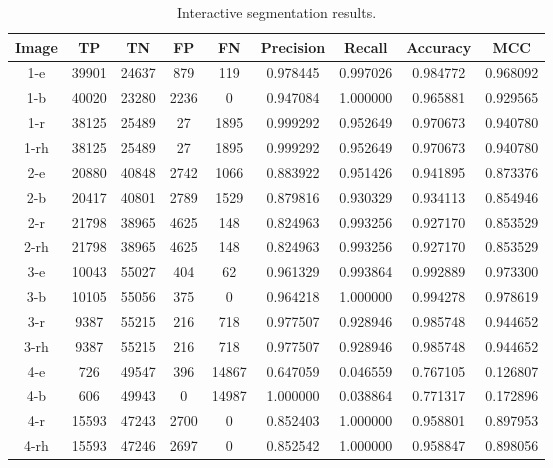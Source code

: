 \clearpage
\begin{longtable}[!h]{|c|c|c|c|c|c|c|c|c|}
	\caption{Interactive segmentation results.} \label{tab:interactiveresults}\\
	\hline	Image	&	TP	&	TN	&	FP	&	FN	&	Precision	&	Recall	&	Accuracy	&	MCC	\\
	\hline \rowcolor{closest} 1-e	&	39901	&	24637	&	879	&	119	&	0.978445	&	0.997026	&	0.984772	&	0.968092	\\
	\hline \rowcolor{bad}	1-b	&	40020	&	23280	&	2236	&	0	&	0.947084	&	1.000000	&	0.965881	&	0.929565	\\
	\hline	1-r	&	38125	&	25489	&	27	&	1895	&	0.999292	&	0.952649	&	0.970673	&	0.940780	\\
	\hline	1-rh	&	38125	&	25489	&	27	&	1895	&	0.999292	&	0.952649	&	0.970673	&	0.940780	\\
	
	\hline \rowcolor{closest} 2-e	&	20880	&	40848	&	2742	&	1066	&	0.883922	&	0.951426	&	0.941895	&	0.873376	\\
	\hline	2-b	&	20417	&	40801	&	2789	&	1529	&	0.879816	&	0.930329	&	0.934113	&	0.854946	\\
	\hline \rowcolor{bad}	2-r	&	21798	&	38965	&	4625	&	148	&	0.824963	&	0.993256	&	0.927170	&	0.853529	\\
	\hline \rowcolor{bad}	2-rh	&	21798	&	38965	&	4625	&	148	&	0.824963	&	0.993256	&	0.927170	&	0.853529	\\
	
	\hline	3-e	&	10043	&	55027	&	404	&	62	&	0.961329	&	0.993864	&	0.992889	&	0.973300	\\
	\hline \rowcolor{closest}	3-b	&	10105	&	55056	&	375	&	0	&	0.964218	&	1.000000	&	0.994278	&	0.978619	\\
	\hline \rowcolor{bad}	3-r	&	9387	&	55215	&	216	&	718	&	0.977507	&	0.928946	&	0.985748	&	0.944652	\\
	\hline \rowcolor{bad}	3-rh	&	9387	&	55215	&	216	&	718	&	0.977507	&	0.928946	&	0.985748	&	0.944652	\\
	
	\hline \rowcolor{bad}	4-e	&	726	&	49547	&	396	&	14867	&	0.647059	&	0.046559	&	0.767105	&	0.126807	\\
	\hline	4-b	&	606	&	49943	&	0	&	14987	&	1.000000	&	0.038864	&	0.771317	&	0.172896	\\
	\hline	4-r	&	15593	&	47243	&	2700	&	0	&	0.852403	&	1.000000	&	0.958801	&	0.897953	\\
	\hline \rowcolor{closest}	4-rh	&	15593	&	47246	&	2697	&	0	&	0.852542	&	1.000000	&	0.958847	&	0.898056	\\
	

\end{longtable}

